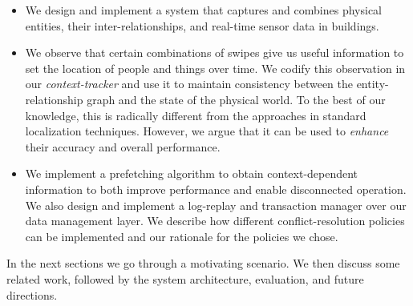 \begin{itemize}
\item We design and implement a system that captures and combines physical entities, their inter-relationships, and real-time sensor data 
		in buildings.%
\item We observe that certain combinations of swipes give us useful information to set the location of people and things over time.
		We codify this observation in our \emph{context-tracker} and use it to maintain consistency between the entity-relationship graph and the 
		state of the physical world.  To the best of our knowledge, this is radically different from the approaches in standard 
		localization techniques.  However, we argue that it can be used to \emph{enhance} their accuracy and overall performance.
\item We implement a prefetching algorithm to obtain context-dependent information to both improve performance and
		enable disconnected operation.  We also design and implement a log-replay and transaction manager over our data management layer.  We describe how different conflict-resolution policies can be implemented and our rationale for the policies we chose.
\end{itemize}

\vspace{0.08in}

In the next sections we go through a motivating scenario.  We then discuss some related work, followed 
by the system architecture, evaluation, and future directions.


